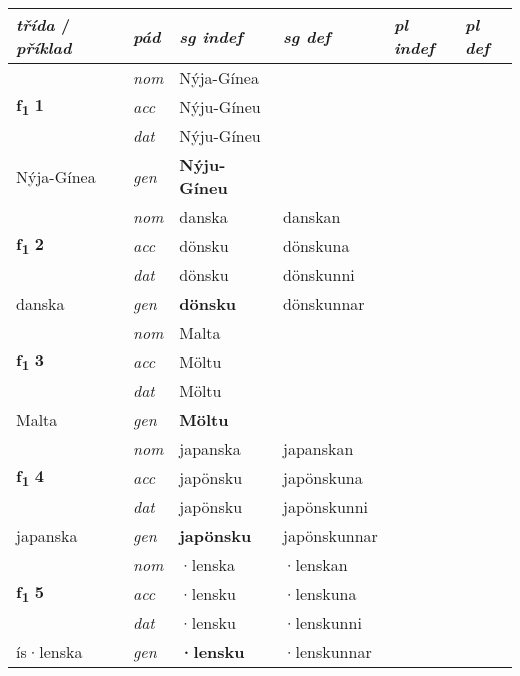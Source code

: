 
\begin{longtable}[l]{X>{\footnotesize\itshape}XXXXX}
{\textbf{\textit{třída}} / \textit{příklad}} & {\textit{pád}} & {\textit{sg indef}} & {\textit{sg def}} & {\textit{pl indef}} & {\textit{pl def}}\\ \cmidrule{1-6}
\endhead
\multirow{3}{*}{{{\textbf{f{\textsubscript{1}}} \Large{\textbf{1}}}}} & nom & Nýja-Gínea &  & \textbf{} &  \\*
 & acc & Nýju-Gíneu &  &  &  \\*
 & dat & Nýju-Gíneu &  &  &  \\*
 {\footnotesize{Nýja-Gínea}} & gen & \textbf{Nýju-Gíneu} &  &  &  \\
\cmidrule{1-6}

\multirow{3}{*}{{{\textbf{f{\textsubscript{1}}} \Large{\textbf{2}}}}} & nom & danska & danskan & \textbf{} &  \\*
 & acc & dönsku & dönskuna &  &  \\*
 & dat & dönsku & dönskunni &  &  \\*
 {\footnotesize{danska}} & gen & \textbf{dönsku} & dönskunnar &  &  \\
\cmidrule{1-6}

\multirow{3}{*}{{{\textbf{f{\textsubscript{1}}} \Large{\textbf{3}}}}} & nom & Malta &  & \textbf{} &  \\*
 & acc & Möltu &  &  &  \\*
 & dat & Möltu &  &  &  \\*
 {\footnotesize{Malta}} & gen & \textbf{Möltu} &  &  &  \\
\cmidrule{1-6}

\multirow{3}{*}{{{\textbf{f{\textsubscript{1}}} \Large{\textbf{4}}}}} & nom & japanska & japanskan & \textbf{} &  \\*
 & acc & japönsku & japönskuna &  &  \\*
 & dat & japönsku & japönskunni &  &  \\*
 {\footnotesize{japanska}} & gen & \textbf{japönsku} & japönskunnar &  &  \\
\cmidrule{1-6}

\multirow{3}{*}{{{\textbf{f{\textsubscript{1}}} \Large{\textbf{5}}}}} & nom & ·lenska & ·lenskan & \textbf{} &  \\*
 & acc & ·lensku & ·lenskuna &  &  \\*
 & dat & ·lensku & ·lenskunni &  &  \\*
 {\footnotesize{ís\allowbreak ·lenska}} & gen & \textbf{·lensku} & ·lenskunnar &  &  \\
\cmidrule{1-6}


\end{longtable}
